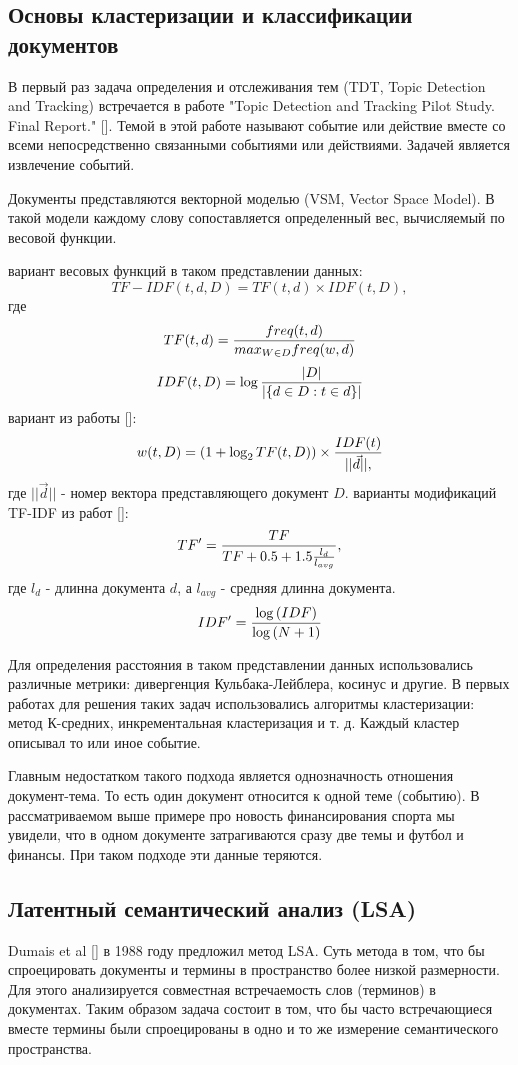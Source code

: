 \subsection{Основы кластеризации и классификации документов}

В первый раз задача определения и отслеживания тем (TDT, Topic Detection and Tracking) встречается в работе 
"Topic Detection and Tracking Pilot Study. Final Report." [\todo{}]. Темой в этой работе называют событие или действие вместе со всеми непосредственно связанными событиями или действиями. Задачей является извлечение событий.

Документы представляются векторной моделью (VSM, Vector Space Model). В такой модели каждому слову сопоставляется определенный вес, вычисляемый по весовой функции.

 вариант весовых функций в таком представлении данных:
$$
TF-IDF(t,d,D)=TF(t,d) \times IDF(t,D),
$$
где
$$
TF(t,d)={{freq(t,d)}\over{max_{W \in D} freq(w,d)}}
$$
$$
IDF(t,D)=\log{{|D|}\over{|\{ d \in D:t \in d \}|}}
$$
 вариант из работы [\todo{}]:
$$
w(t,D)=(1+\log_2{TF(t,D)}) \times {{IDF(t)}\over{||\vec{d}||},}
$$
где $||\vec{d}||$ - номер вектора представляющего документ $D$.
 варианты модификаций TF-IDF из работ [\todo{}]:
$$
TF'={{TF}\over{TF+0.5+1.5{{l_d}\over{l_{avg}}}}},
$$
где $l_d$ - длинна документа $d$, а $l_{avg}$ - средняя длинна документа.
$$
IDF'={{\log{(IDF)}}\over{\log{(N+1)}}}
$$

Для определения расстояния в таком представлении данных использовались различные метрики: дивергенция Кульбака-Лейблера, косинус и другие. В первых работах для решения таких задач использовались алгоритмы кластеризации: метод К-средних, инкрементальная кластеризация и т. д. Каждый кластер описывал то или иное событие.

Главным недостатком такого подхода является однозначность отношения документ-тема. То есть один документ относится к одной теме (событию). В рассматриваемом выше примере про новость финансирования спорта мы увидели, что в одном документе затрагиваются сразу две темы и футбол и финансы. При таком подходе эти данные теряются.

\subsection{Латентный семантический анализ (LSA)}

Dumais et al [\todo{}] в 1988 году предложил метод LSA. Суть метода в том, что бы спроецировать документы и термины в пространство более низкой размерности. Для этого анализируется совместная встречаемость слов (терминов) в документах. Таким образом задача состоит в том, что бы часто встречающиеся вместе термины были спроецированы в одно и то же измерение семантического пространства.

